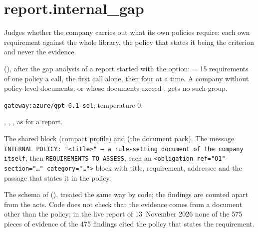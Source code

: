 \section{report.internal\_gap}\label{sec:aprompts:report-internal_gap}

 Judges whether the company carries out what its own policies require:
each own requirement against the whole library, the policy that states it being the criterion
and never the evidence.

  (), after the gap
analysis of a report started with the  option:  = 15
requirements of one policy a call, the first call alone, then four at a time. A company
without policy-level documents, or whose documents exceed , gets no
such group.

 \texttt{gateway:azure/gpt-6.1-sol}; temperature 0.

 , , , as for a
report.

 The shared block  (compact profile) and
 (the document pack). The message \texttt{INTERNAL POLICY: "<title>" — a rule-setting document of the company itself}, then \texttt{REQUIREMENTS TO ASSESS}, each an
\texttt{<obligation ref="O1" section="…" category="…">} block with title, requirement, addressee
and the passage that states it in the policy.

 The schema of 
(), treated the same way by code; the findings are counted apart from the
acts. Code does not check that the evidence comes from a document other than the policy; in
the live report of 13~November 2026 none of the 575 pieces of evidence of the 475 findings
cited the policy that states the requirement.

